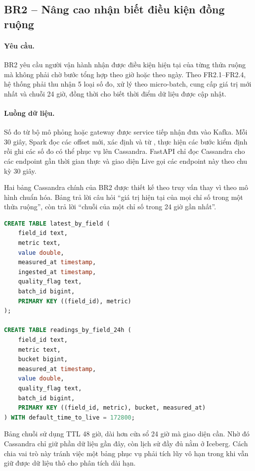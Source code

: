\subsection{BR2 -- Nâng cao nhận biết điều kiện đồng ruộng}
\label{sec:4-br02}

\paragraph{Yêu cầu.}
BR2 yêu cầu người vận hành nhận được điều kiện hiện tại của từng thửa ruộng mà không phải chờ bước tổng hợp theo giờ hoặc theo ngày. Theo FR2.1--FR2.4, hệ thống phải thu nhận 5 loại số đo, xử lý theo micro-batch, cung cấp giá trị mới nhất và chuỗi 24 giờ, đồng thời cho biết thời điểm dữ liệu được cập nhật.

\paragraph{Luồng dữ liệu.}
Số đo từ bộ mô phỏng hoặc gateway được service tiếp nhận đưa vào Kafka. Mỗi 30 giây, Spark đọc các offset mới, xác định  và  từ , thực hiện các bước kiểm định rồi ghi các số đo có thể phục vụ lên Cassandra. FastAPI chỉ đọc Cassandra cho các endpoint gần thời gian thực và giao diện Live gọi các endpoint này theo chu kỳ 30 giây.

Hai bảng Cassandra chính của BR2 được thiết kế theo truy vấn thay vì theo mô hình chuẩn hóa. Bảng  trả lời câu hỏi ``giá trị hiện tại của mọi chỉ số trong một thửa ruộng'', còn  trả lời ``chuỗi của một chỉ số trong 24 giờ gần nhất''.

\begin{lstlisting}[language=SQL, caption={Hai khóa truy vấn chính của BR2}, label={lst:4-br02-cassandra}]
CREATE TABLE latest_by_field (
    field_id text,
    metric text,
    value double,
    measured_at timestamp,
    ingested_at timestamp,
    quality_flag text,
    batch_id bigint,
    PRIMARY KEY ((field_id), metric)
);

CREATE TABLE readings_by_field_24h (
    field_id text,
    metric text,
    bucket bigint,
    measured_at timestamp,
    value double,
    quality_flag text,
    batch_id bigint,
    PRIMARY KEY ((field_id, metric), bucket, measured_at)
) WITH default_time_to_live = 172800;
\end{lstlisting}

Bảng chuỗi sử dụng TTL 48 giờ, dài hơn cửa sổ 24 giờ mà giao diện cần. Nhờ đó Cassandra chỉ giữ phần dữ liệu gần đây, còn lịch sử đầy đủ nằm ở Iceberg. Cách chia vai trò này tránh việc một bảng phục vụ phải tích lũy vô hạn trong khi vẫn giữ được dữ liệu thô cho phân tích dài hạn.

